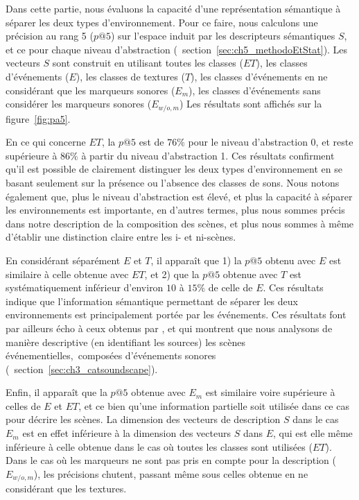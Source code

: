 Dans cette partie, nous évaluons la capacité d'une représentation sémantique à séparer les deux types d'environnement. Pour ce faire, nous calculons une précision au rang 5 ($p@5$) sur l'espace induit par les descripteurs sémantiques $S$, et ce pour chaque niveau d'abstraction (\cf~section~\ref{sec:ch5_methodoEtStat}). Les vecteurs $S$ sont construit en utilisant toutes les classes ($ET$), les classes d'événements ($E$), les classes de textures ($T$), les classes d'événements en ne considérant que les marqueurs sonores ($E_m$),  les classes d'événements sans considérer les marqueurs sonores ($E_{w/o,m}$)  Les résultats sont affichés sur la figure~\ref{fig:pa5}.

En ce qui concerne $ET$, la $p@5$ est de $76\%$ pour le niveau d'abstraction 0, et reste supérieure à $86\%$ à partir du niveau d'abstraction 1. Ces résultats confirment qu'il est possible de clairement distinguer les deux types d'environnement en se basant seulement sur la présence ou l'absence des classes de sons. Nous notons également que, plus le niveau d'abstraction est élevé, et plus la capacité à séparer les environnements est importante, en d'autres termes, plus nous sommes précis dans notre description de la composition des scènes, et plus nous sommes à même d'établir une distinction claire entre les i- et ni-scènes.

En considérant séparément $E$ et $T$, il apparaît que 1) la $p@5$ obtenu avec $E$ est similaire à celle obtenue avec $ET$, et 2) que la $p@5$ obtenue avec $T$ est systématiquement inférieur d'environ $10$ à $15\%$ de celle de $E$. Ces résultats indique que l'information sémantique permettant de séparer les deux environnements est principalement portée par les événements. Ces résultats font par ailleurs écho à ceux obtenus par  \citep{maffiolo_caracterisation_1999}, et qui montrent que nous analysons de manière descriptive (en identifiant les sources) les scènes événementielles,\ie~composées d'événements sonores (\cf~section~\ref{sec:ch3_catsoundscape}).

Enfin, il apparaît que la $p@5$ obtenue avec $E_{m}$ est similaire voire supérieure à celles de $E$ et $ET$, et ce bien qu'une information partielle soit utilisée dans ce cas pour décrire les scènes. La dimension des vecteurs de description $S$ dans le cas $E_m$ est en effet inférieure à la dimension des vecteurs $S$ dans $E$, qui est elle même inférieure à celle obtenue dans le cas où toutes les classes sont utilisées ($ET$). Dans le cas où les marqueurs ne sont pas pris en compte pour la description ($E_{w/o,m}$), les précisions chutent, passant même sous celles obtenue en ne considérant que les textures.


